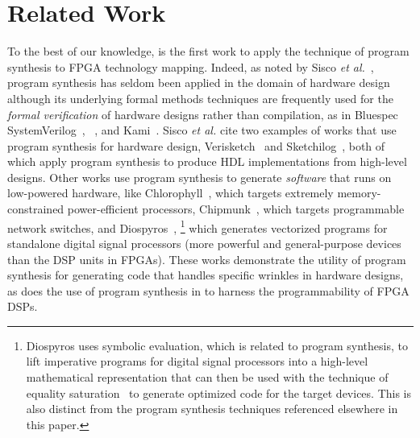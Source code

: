 \section{Related Work}
\label{sec:background-and-related-work}

To the best of our knowledge,
  \lr is the first work
  to apply the technique of program synthesis
  to FPGA technology mapping.
Indeed, as noted by Sisco \textit{et al.}~\cite{sisco2022synthesis},
  program synthesis has seldom been applied
  in the domain of hardware design although
  its underlying formal methods techniques
  are frequently used for
  the \textit{formal verification}
  of hardware designs rather than compilation,
  as in Bluespec SystemVerilog~\cite{nikhil2004bluespec},
  \koika~\cite{bourgeat2020essence},
  and Kami~\cite{choi2017kami}.
Sisco \textit{et al.} cite two examples
  of works that use program synthesis for hardware design,
  Verisketch~\cite{ardeshiricham19verisketch} and Sketchilog~\cite{becker14sketchilog},
  both of which apply program synthesis to produce HDL implementations from high-level designs.
Other works use program synthesis
  to generate \textit{software}
  that runs on low-powered hardware,
  like Chlorophyll~\cite{phothilimthana2014chlorophyll},
  which targets extremely memory-constrained
  power-efficient processors,
  Chipmunk~\cite{gao2019chipmunk},
  which targets programmable network switches,
  and Diospyros~\cite{vanhattum2021vectorization},%
  \footnote{Diospyros uses symbolic evaluation, which is related to program synthesis, to lift imperative programs for digital signal processors into a high-level mathematical representation that can then be used with the technique of equality saturation~\cite{tate2011equality} to generate optimized code for the target devices. This is also distinct from the program synthesis techniques referenced elsewhere in this paper.}
  which generates vectorized programs for standalone digital signal processors (more powerful and general-purpose devices than the DSP units in FPGAs).
These works demonstrate the utility of program synthesis 
  for generating code that handles
  specific wrinkles in hardware designs,
  as does the use of program synthesis in \lr
  to harness the programmability of FPGA DSPs.

